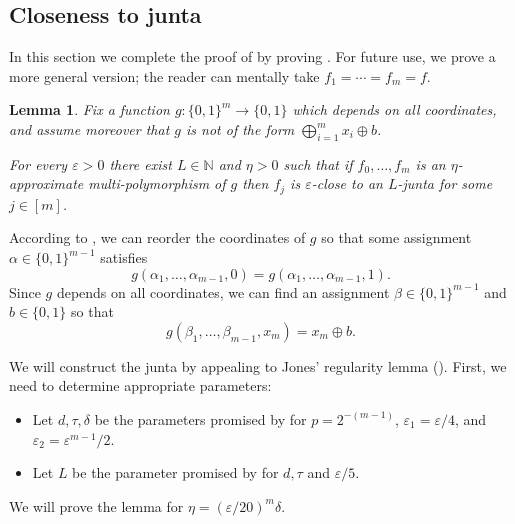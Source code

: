 \documentclass{article}
\newtheorem{lemma}[theorem]{Lemma}
\theoremstyle{definition}
\theoremstyle{remark}
\providecommand{\h}{g}
\newcommand\eps{\varepsilon}
\renewcommand\epsilon{\eps}
\begin{document}
\subsection{Closeness to junta}
\label{sec:approximate-polymorphisms-junta}

In this section we complete the proof of  by proving . For future use, we prove a more general version; the reader can mentally take $f_1 = \cdots = f_m = f$.

\begin{lemma} \label{lem:f-junta-general}
Fix a function $g\colon \{0,1\}^m \to \{0,1\}$ which depends on all coordinates, and assume moreover that $g$ is not of the form $\bigoplus_{i=1}^m x_i \oplus b$.

For every $\epsilon > 0$ there exist $L \in \mathbb{N}$ and $\eta > 0$ such that if $f_0,\ldots,f_m$ is an $\eta$-approximate multi-polymorphism of $g$ then $f_j$ is $\epsilon$-close to an $L$-junta for some $j \in [m]$.
\end{lemma}

According to , we can reorder the coordinates of $g$ so that some assignment $\alpha \in \{0,1\}^{m-1}$ satisfies
\[
 g(\alpha_1,\ldots,\alpha_{m-1},0) = g(\alpha_1,\ldots,\alpha_{m-1},1).
\]
Since $\h$ depends on all coordinates, we can find an assignment $\beta \in \{0,1\}^{m-1}$ and $b \in \{0,1\}$ so that
\[
 g(\beta_1,\ldots,\beta_{m-1},x_m) = x_m \oplus b.
\]

We will construct the junta by appealing to Jones' regularity lemma (). First, we need to determine appropriate parameters:
\begin{itemize}
    \item Let $d,\tau,\delta$ be the parameters promised by  for $p = 2^{-(m-1)}$, $\epsilon_1 = \epsilon/4$, and $\epsilon_2 = \epsilon^{m-1}/2$.
    \item Let $L$ be the parameter promised by  for $d,\tau$ and $\epsilon/5$.
\end{itemize}
We will prove the lemma for $\eta = (\epsilon/20)^m\delta$.
\end{document}
